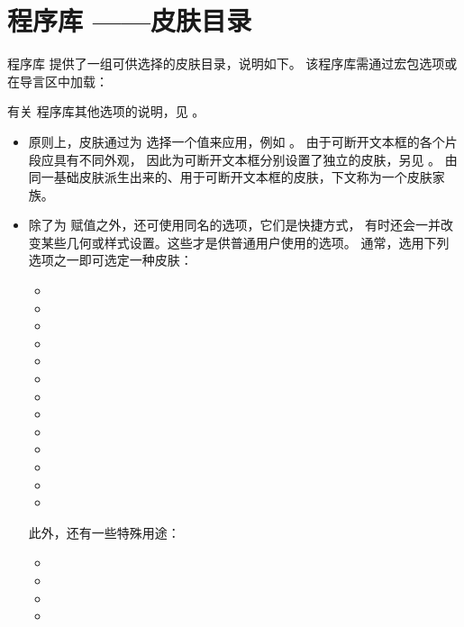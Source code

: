 \clearpage
\section{程序库 ——皮肤目录}\label{sec:skincatalog}%
%
程序库  提供了一组可供选择的皮肤目录，说明如下。
该程序库需通过宏包选项或在导言区中加载：
\begin{dispListing}
\end{dispListing}

有关  程序库其他选项的说明，见 。

\begin{itemize}
\item 原则上，皮肤通过为  选择一个值来应用，例如 。
  由于可断开文本框的各个片段应具有不同外观，
  因此为可断开文本框分别设置了独立的皮肤，另见 。
  由同一基础皮肤派生出来的、用于可断开文本框的皮肤，下文称为一个皮肤家族。
\item 除了为  赋值之外，还可使用同名的选项，它们是快捷方式，
  有时还会一并改变某些几何或样式设置。这些才是供普通用户使用的选项。
  通常，选用下列选项之一即可选定一种皮肤：
  \begin{itemize}
  \item {}
  \item {}
  \item {}
  \item {}
  \item {}
  \item {}
  \item {}
  \item {}
  \item {}
  \item {}
  \item {}
  \item {}
  \item {}
  \end{itemize}
  此外，还有一些特殊用途：
  \begin{itemize}
  \item {}
  \item {}
  \item {}
  \item {}
  \end{itemize}
\end{itemize}



